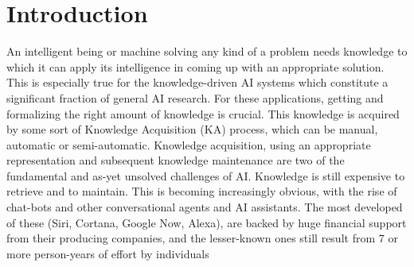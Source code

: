 % 
\chapter{Introduction}
An intelligent being or machine solving any kind of a problem needs knowledge to which it can apply its intelligence in coming up with an appropriate solution. This is especially true for the knowledge-driven AI systems which constitute a significant fraction of general AI research. For these applications, getting and formalizing the right amount of knowledge is crucial. This knowledge is acquired by some sort of Knowledge Acquisition (KA) process, which can be manual, automatic or semi-automatic. Knowledge acquisition, using an appropriate representation and subsequent knowledge maintenance are two of the fundamental and as-yet unsolved challenges of AI. Knowledge is still expensive to retrieve and to maintain. This is becoming increasingly obvious, with the rise of chat-bots and other conversational agents and AI assistants. The most developed of these (Siri, Cortana, Google Now, Alexa), are backed by huge financial support from their producing companies, and the lesser-known ones still result from 7 or more person-years of effort by individuals